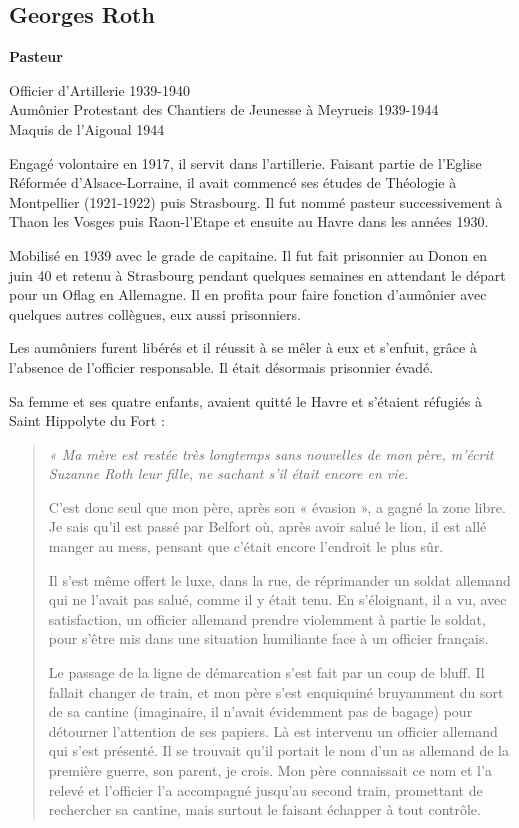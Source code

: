 \subsection{Georges Roth}

\begin{center}
{\large\bfseries Pasteur}

\vspace{2em}

Officier d’Artillerie 1939-1940\\
Aumônier Protestant des Chantiers de Jeunesse à Meyrueis 1939-1944\\
Maquis de l’Aigoual 1944
\end{center}

\vspace{1em}

Engagé volontaire en 1917, il servit dans l’artillerie. Faisant partie de l’Eglise Réformée
d’Alsace-Lorraine, il avait commencé ses études de Théologie à Montpellier (1921-1922) puis
Strasbourg. Il fut nommé pasteur successivement à Thaon les Vosges puis Raon-l’Etape et
ensuite au Havre dans les années 1930.

Mobilisé en 1939 avec le grade de capitaine. Il fut fait prisonnier au Donon en juin 40 et
retenu à Strasbourg pendant quelques semaines en attendant le départ pour un Oflag en
Allemagne. Il en profita pour faire fonction d’aumônier avec quelques autres collègues, eux
aussi prisonniers.

Les aumôniers furent libérés et il réussit à se mêler à eux et s’enfuit, grâce à l’absence de
l’officier responsable. Il était désormais prisonnier évadé.

Sa femme et ses quatre enfants, avaient quitté le Havre et s’étaient réfugiés à Saint Hippolyte
du Fort :

\begin{quote}\itshape
« Ma mère est restée très longtemps sans nouvelles de mon père, m’écrit Suzanne Roth leur
fille, ne sachant s’il était encore en vie.

C’est donc seul que mon père, après son « évasion », a gagné la zone libre. Je sais qu’il est
passé par Belfort où, après avoir salué le lion, il est allé manger au mess, pensant que c’était
encore l’endroit le plus sûr.

Il s’est même offert le luxe, dans la rue, de réprimander un soldat allemand qui ne l’avait pas
salué, comme il y était tenu. En s’éloignant, il a vu, avec satisfaction, un officier allemand
prendre violemment à partie le soldat, pour s’être mis dans une situation humiliante face à un
officier français.

Le passage de la ligne de démarcation s’est fait par un coup de bluff. Il fallait changer de
train, et mon père s’est enquiquiné bruyamment du sort de sa cantine (imaginaire, il n’avait
évidemment pas de bagage) pour détourner l’attention de ses papiers. Là est intervenu un
officier allemand qui s’est présenté. Il se trouvait qu’il portait le nom d’un as allemand de la
première guerre, son parent, je crois. Mon père connaissait ce nom et l’a relevé et l’officier
l’a accompagné jusqu’au second train, promettant de rechercher sa cantine, mais surtout le
faisant échapper à tout contrôle.
\end{quote}

